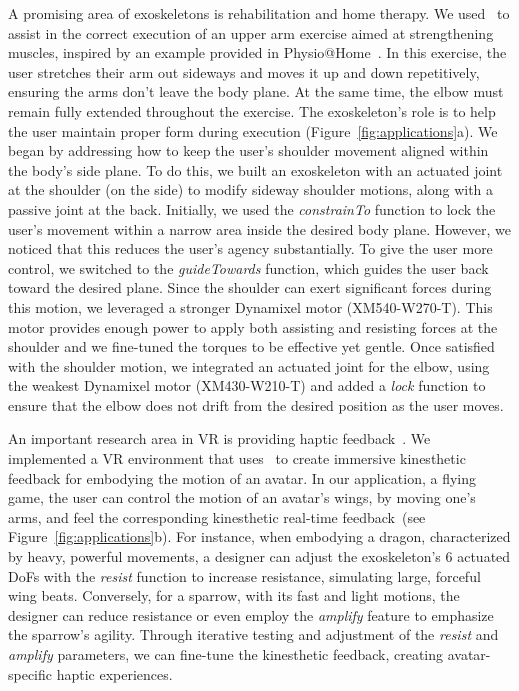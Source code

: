 A promising area of exoskeletons is rehabilitation and home therapy. We used \toolkit~to assist in the correct execution of an upper arm exercise aimed at strengthening muscles, inspired by an example provided in Physio@Home~\cite{tang_2015}. In this exercise, the user stretches their arm out sideways and moves it up and down repetitively, ensuring the arms don’t leave the body plane. At the same time, the elbow must remain fully extended throughout the exercise. The exoskeleton’s role is to help the user maintain proper form during execution (Figure~\ref{fig:applications}a).
We began by addressing how to keep the user's shoulder movement aligned within the body’s side plane. To do this, we built an exoskeleton with an actuated joint at the shoulder (on the side) to modify sideway shoulder motions, along with a passive joint at the back. Initially, we used the \textit{constrainTo} function to lock the user's movement within a narrow area inside the desired body plane. However, we noticed that this reduces the user’s agency substantially. To give the user more control, we switched to the \textit{guideTowards} function, which guides the user back toward the desired plane. Since the shoulder can exert significant forces during this motion, we leveraged a stronger Dynamixel motor (XM540-W270-T). This motor provides enough power to apply both assisting and resisting forces at the shoulder and we fine-tuned the torques to be effective yet gentle. 
Once satisfied with the shoulder motion, we integrated an actuated joint for the elbow, using the weakest Dynamixel motor (XM430-W210-T) and added a \textit{lock} function to ensure that the elbow does not drift from the desired position as the user moves.


An important research area in VR is providing haptic feedback~\cite{teng_2022,gu_2016}. We implemented a VR environment that uses \toolkit~to create immersive kinesthetic feedback for embodying the motion of an avatar. In our application, a flying game, the user can control the motion of an avatar's wings, by moving one's arms, and feel the corresponding kinesthetic real-time feedback~(see Figure~\ref{fig:applications}b).
For instance, when embodying a dragon, characterized by heavy, powerful movements, a designer can adjust the exoskeleton’s 6 actuated DoFs with the \textit{resist} function to increase resistance, simulating large, forceful wing beats. Conversely, for a sparrow, with its fast and light motions, the designer can reduce resistance or even employ the \textit{amplify} feature to emphasize the sparrow's agility. Through iterative testing and adjustment of the \textit{resist} and \textit{amplify} parameters, we can fine-tune the kinesthetic feedback, creating avatar-specific haptic experiences.


